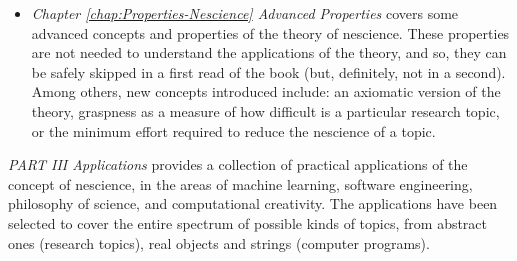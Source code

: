 \begin{itemize}
\item \emph{Chapter \ref{chap:Properties-Nescience} Advanced Properties} covers some advanced concepts and properties of the theory of nescience. These properties are not needed to understand the applications of the theory, and so, they can be safely skipped in a first read of the book (but, definitely, not in a second). Among others, new concepts introduced include: an axiomatic version of the theory, graspness as a measure of how difficult is a particular research topic, or the minimum effort required to reduce the nescience of a topic.

\end{itemize}

\bigskip

\emph{PART III Applications} provides a collection of practical applications of the concept of nescience, in the areas of machine learning, software engineering, philosophy of science, and computational creativity. The applications have been selected to cover the entire spectrum of possible kinds of topics, from abstract ones (research topics), real objects and strings (computer programs).

